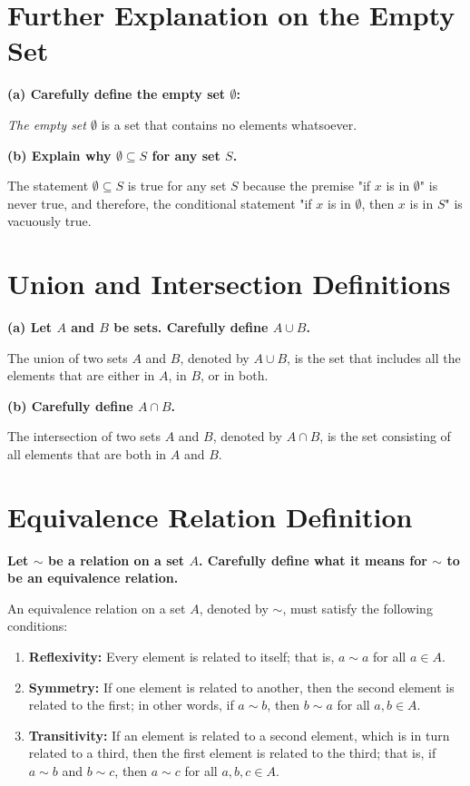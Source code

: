 \section*{Further Explanation on the Empty Set}

\textbf{(a) Carefully define the empty set \( \emptyset \):}

\textit{The empty set \( \emptyset \)} is a set that contains no elements whatsoever.

\textbf{(b) Explain why \( \emptyset \subseteq S \) for any set \( S \).}

The statement \( \emptyset \subseteq S \) is true for any set \( S \) because the premise "if \( x \) is in \( \emptyset \)" is never true, and therefore, the conditional statement "if \( x \) is in \( \emptyset \), then \( x \) is in \( S \)" is vacuously true.

\section*{Union and Intersection Definitions}

\textbf{(a) Let \( A \) and \( B \) be sets. Carefully define \( A \cup B \).}

The union of two sets \( A \) and \( B \), denoted by \( A \cup B \), is the set that includes all the elements that are either in \( A \), in \( B \), or in both.

\textbf{(b) Carefully define \( A \cap B \).}

The intersection of two sets \( A \) and \( B \), denoted by \( A \cap B \), is the set consisting of all elements that are both in \( A \) and \( B \).

\section*{Equivalence Relation Definition}

\textbf{Let \( \sim \) be a relation on a set \( A \). Carefully define what it means for \( \sim \) to be an equivalence relation.}

An equivalence relation on a set \( A \), denoted by \( \sim \), must satisfy the following conditions:
\begin{enumerate}
    \item \textbf{Reflexivity:} Every element is related to itself; that is, \( a \sim a \) for all \( a \in A \).
    \item \textbf{Symmetry:} If one element is related to another, then the second element is related to the first; in other words, if \( a \sim b \), then \( b \sim a \) for all \( a, b \in A \).
    \item \textbf{Transitivity:} If an element is related to a second element, which is in turn related to a third, then the first element is related to the third; that is, if \( a \sim b \) and \( b \sim c \), then \( a \sim c \) for all \( a, b, c \in A \).
\end{enumerate}

